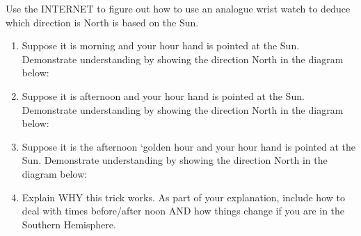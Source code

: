 \documentclass[noauthor,nooutcomes,handout,hints]{ximera}
\begin{document}
\mynewpage




\begin{question}
  Use the INTERNET to figure out how to use an analogue wrist watch to
  deduce which direction is North is based on the Sun. 
  \begin{enumerate}
  \item Suppose it is morning and your hour hand is pointed at the
    Sun.  Demonstrate understanding by showing the direction North in
    the diagram below:
    \begin{center}
    \end{center}
     \item Suppose it is afternoon and your hour hand is pointed at
       the Sun. Demonstrate understanding by showing the direction
       North in the diagram below:
    \begin{center}
    \end{center}
  \item Suppose it is the afternoon `golden hour and your hour hand is
    pointed at the Sun. Demonstrate understanding by showing the
    direction North in the diagram below:
    \begin{center}
    \end{center}
  \item Explain WHY this trick works. As part of your explanation,
    include how to deal with times before/after noon AND how things
    change if you are in the Southern Hemisphere.
  \end{enumerate}




  
\end{question}
\end{document}
